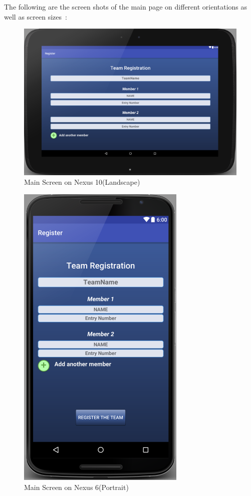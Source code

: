\documentclass{article}
\begin{document}
\par\noindent The following are the screen shots of the main page on different orientations as well as screen sizes~\cite{figures_in_latex}:

\begin{figure}
	\centering
  \includegraphics[scale=0.8]{N10-land.PNG}
  \caption{ Main Screen on Nexus 10(Landscape)}
  \label{n10main}
\end{figure}

\begin{figure}
    \centering
    \includegraphics[scale=0.75]{N6.PNG}
    \caption{Main Screen on Nexus 6(Portrait)}
    \label{n9p}
\end{figure}
\end{document}

